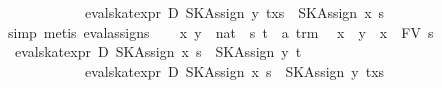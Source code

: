 \begin{isabellebody}
\ \ \ \ \ \ \ \ \ \ \ \ eval{}skat{}expr\ D\ {}SKAssign\ y\ {}t{}x{}s{}{}\ {}\ SKAssign\ x\ s{}\ {}{}\isanewline
\ \ \ \ \isamarkupfalse%
\ {}simp{}\ metis\ eval{}assigns{}{}\isanewline
{}\isamarkupfalse%
\isanewline
\ \ \isamarkupfalse%
\ x\ y\ {}{}\ nat\ \ s\ t\ {}{}\ {}{}a\ trm{}\ \isamarkupfalse%
\ {}x\ {}\ y{}\ \ {}x\ {}\ FV\ s{}\isanewline
\ \ \isamarkupfalse%
\ {}{}{}{}\ eval{}skat{}expr\ D\ {}SKAssign\ x\ s\ {}\ SKAssign\ y\ t{}\ {}\ {}\isanewline
\ \ \ \ \ \ \ \ \ \ \ \ eval{}skat{}expr\ D\ {}SKAssign\ x\ s\ {}\ SKAssign\ y\ {}t{}x{}s{}{}{}\ {}{}\isanewline
\ \ \ \ \isamarkupfalse%

\end{isabellebody}
